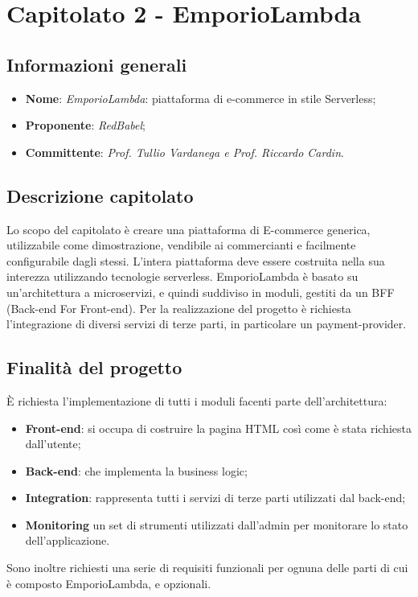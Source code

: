 \section{Capitolato 2 - EmporioLambda}
\subsection{Informazioni generali}
\begin{itemize}
    \item \textbf{Nome}: \emph{EmporioLambda}: piattaforma di e-commerce in stile Serverless;
    \item \textbf{Proponente}: \emph{RedBabel};
    \item \textbf{Committente}: \emph{Prof. Tullio Vardanega e Prof. Riccardo Cardin}.
\end{itemize}
\subsection{Descrizione capitolato}
Lo scopo del capitolato è creare una piattaforma di E-commerce generica, utilizzabile come dimostrazione, vendibile ai commercianti e facilmente configurabile dagli stessi. L'intera piattaforma deve essere costruita nella sua interezza utilizzando tecnologie serverless. EmporioLambda è basato su un'architettura a microservizi, e quindi suddiviso in moduli, gestiti da un BFF (Back-end For Front-end). Per la realizzazione del progetto è richiesta l'integrazione di diversi servizi di terze parti, in particolare un payment-provider.
\subsection{Finalità del progetto}
È richiesta l'implementazione di tutti i moduli facenti parte dell'architettura:
\begin{itemize}
	\item \textbf{Front-end}: si occupa di costruire la pagina HTML così come è stata richiesta dall'utente;
	\item \textbf{Back-end}: che implementa la business logic;
	\item \textbf{Integration}: rappresenta tutti i servizi di terze parti utilizzati dal back-end;
	\item \textbf{Monitoring} un set di strumenti utilizzati dall'admin per monitorare lo stato dell'applicazione.
\end{itemize}
Sono inoltre richiesti una serie di requisiti funzionali per ognuna delle parti di cui è composto EmporioLambda, e opzionali.
